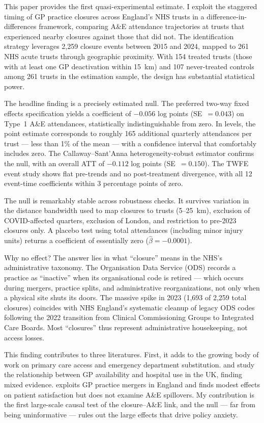 \documentclass[12pt]{article}
\begin{document}
This paper provides the first quasi-experimental estimate. I exploit the staggered timing of GP practice closures across England's NHS trusts in a difference-in-differences framework, comparing A\&E attendance trajectories at trusts that experienced nearby closures against those that did not. The identification strategy leverages 2,259 closure events between 2015 and 2024, mapped to 261 NHS acute trusts through geographic proximity. With 154 treated trusts (those with at least one GP deactivation within 15~km) and 107 never-treated controls among 261 trusts in the estimation sample, the design has substantial statistical power.

The headline finding is a precisely estimated null. The preferred two-way fixed effects specification yields a coefficient of $-0.056$ log points (SE~$= 0.043$) on Type~1 A\&E attendances, statistically indistinguishable from zero. In levels, the point estimate corresponds to roughly 165 additional quarterly attendances per trust --- less than 1\% of the mean --- with a confidence interval that comfortably includes zero. The Callaway--Sant'Anna heterogeneity-robust estimator confirms the null, with an overall ATT of $-0.112$ log points (SE~$= 0.150$). The TWFE event study shows flat pre-trends and no post-treatment divergence, with all 12 event-time coefficients within 3 percentage points of zero.

The null is remarkably stable across robustness checks. It survives variation in the distance bandwidth used to map closures to trusts (5--25~km), exclusion of COVID-affected quarters, exclusion of London, and restriction to pre-2023 closures only. A placebo test using total attendances (including minor injury units) returns a coefficient of essentially zero ($\hat{\beta} = -0.0001$).

Why no effect? The answer lies in what ``closure'' means in the NHS's administrative taxonomy. The Organisation Data Service (ODS) records a practice as ``inactive'' when its organisational code is retired --- which occurs during mergers, practice splits, and administrative reorganizations, not only when a physical site shuts its doors. The massive spike in 2023 (1,693 of 2,259 total closures) coincides with NHS England's systematic cleanup of legacy ODS codes following the 2022 transition from Clinical Commissioning Groups to Integrated Care Boards. Most ``closures'' thus represent administrative housekeeping, not access losses.

This finding contributes to three literatures. First, it adds to the growing body of work on primary care access and emergency department substitution. \citet{Dolton2017} and \citet{Crawford2004} study the relationship between GP availability and hospital use in the UK, finding mixed evidence. \citet{Pinchbeck2019} exploits GP practice mergers in England and finds modest effects on patient satisfaction but does not examine A\&E spillovers. My contribution is the first large-scale causal test of the closure--A\&E link, and the null --- far from being uninformative --- rules out the large effects that drive policy anxiety.
\end{document}
